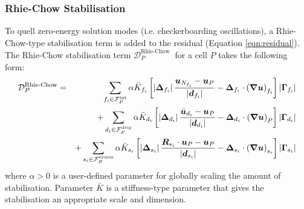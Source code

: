 \documentclass[sn-mathphys,Numbered]{sn-jnl}%
\newcommand{\bb}{\boldsymbol}
\begin{document}
\subsubsection{Rhie-Chow Stabilisation}
To quell zero-energy solution modes (i.e. checkerboarding oscillations), a Rhie-Chow-type stabilisation term \cite{Rhie1983} is added to the residual (Equation \ref{eqn:residual}).
The Rhie-Chow stabilisation term  $\mathcal{D}_P^{\text {Rhie-Chow }}$ for a cell $P$ takes the following form:
\begin{eqnarray} \label{eq:RhieChow}
	\mathcal{D}_P^{\text {Rhie-Chow}}
	&=& \sum_{f_i \in \mathcal{F}^{\text{int}}_P} \alpha \bar{K}_{f_i} \left[
		\left|\bb{\Delta}_{f_i} \right| \frac{ \bb{u}_{N_{f_i}} - \bb{u}_P}{\left|\bb{d}_{f_i}\right|}	- \bb{\Delta}_{f_i} \cdot \left(\bb{\nabla} \bb{u} \right)_{f_i}
		\right]    \left|\bb{\Gamma}_{f_i}\right| \notag \\
	&&+ \sum_{d_i \in \mathcal{F}^{\text{disp}}_P} \alpha \bar{K}_{d_i} \left[
		\left|\bb{\Delta}_{d_i} \right| \frac{ \bar{\bb{u}}_{d_i} - \bb{u}_P}{\left|\bb{d}_{d_i}\right|}	- \bb{\Delta}_{d_i} \cdot \left(\bb{\nabla} \bb{u} \right)_{P}
		\right]    \left|\bb{\Gamma}_{d_i}\right| \notag \\
	&&+ \sum_{s_i \in \mathcal{F}^{\text{symm}}_P} \alpha \bar{K}_{s_i} \left[
		\left|\bb{\Delta}_{s_i} \right| \frac{ \bb{R}_{s_i} \cdot \bb{u}_{P} - \bb{u}_P}{\left|\bb{d}_{s_i}\right|} - \bb{\Delta}_{s_i} \cdot \left(\bb{\nabla} \bb{u} \right)_{s_i}
		\right]    \left|\bb{\Gamma}_{s_i}\right|
\end{eqnarray}
where $\alpha > 0$ is a user-defined parameter for globally scaling the amount of stabilisation.
Parameter $\bar{K}$ is a stiffness-type parameter that gives the stabilisation an appropriate scale and dimension.
\end{document}
